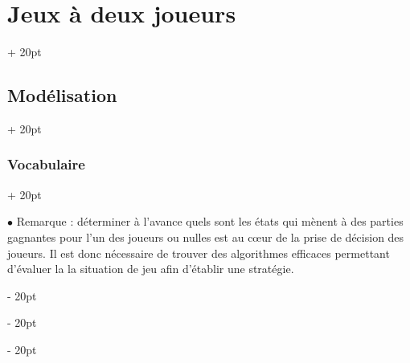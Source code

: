 \documentclass[a4paper, 12pt, twoside]{article}
\newcommand{\ind}[1][20pt]{\advance\leftskip + #1}
\newcommand{\deind}[1][20pt]{\advance\leftskip - #1}
\newenvironment{indt}[2][20pt]{#2 \par \ind[#1]}{\par \deind} %
\begin{document}
\begin{indt}{\section{Jeux à deux joueurs}}
\begin{indt}{\subsection{Modélisation}}
\begin{indt}{\subsubsection{Vocabulaire}}
                \vspace{12pt}
                
                $\bullet$ Remarque : déterminer à l'avance quels sont les états qui mènent à des parties gagnantes pour l'un des joueurs ou nulles est au c\oe ur de la prise de décision des joueurs. Il est donc nécessaire de trouver des algorithmes efficaces permettant d'évaluer la la situation de jeu afin d'établir une stratégie.
            \end{indt}
        \end{indt}
    \end{indt}
    
\end{document}
